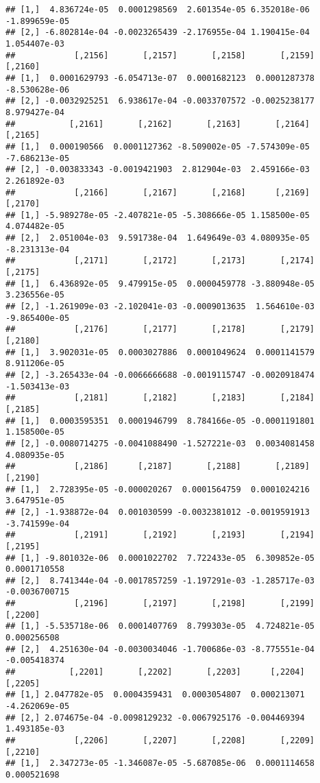 \documentclass[
]{article}
\begin{document}
\begin{verbatim}
## [1,]  4.836724e-05  0.0001298569  2.601354e-05 6.352018e-06 -1.899659e-05
## [2,] -6.802814e-04 -0.0023265439 -2.176955e-04 1.190415e-04  1.054407e-03
##            [,2156]       [,2157]       [,2158]       [,2159]       [,2160]
## [1,]  0.0001629793 -6.054713e-07  0.0001682123  0.0001287378 -8.530628e-06
## [2,] -0.0032925251  6.938617e-04 -0.0033707572 -0.0025238177  8.979427e-04
##           [,2161]       [,2162]       [,2163]       [,2164]       [,2165]
## [1,]  0.000190566  0.0001127362 -8.509002e-05 -7.574309e-05 -7.686213e-05
## [2,] -0.003833343 -0.0019421903  2.812904e-03  2.459166e-03  2.261892e-03
##            [,2166]       [,2167]       [,2168]      [,2169]       [,2170]
## [1,] -5.989278e-05 -2.407821e-05 -5.308666e-05 1.158500e-05  4.074482e-05
## [2,]  2.051004e-03  9.591738e-04  1.649649e-03 4.080935e-05 -8.231313e-04
##            [,2171]       [,2172]       [,2173]       [,2174]       [,2175]
## [1,]  6.436892e-05  9.479915e-05  0.0000459778 -3.880948e-05  3.236556e-05
## [2,] -1.261909e-03 -2.102041e-03 -0.0009013635  1.564610e-03 -9.865400e-05
##            [,2176]       [,2177]       [,2178]       [,2179]       [,2180]
## [1,]  3.902031e-05  0.0003027886  0.0001049624  0.0001141579  8.911206e-05
## [2,] -3.265433e-04 -0.0066666688 -0.0019115747 -0.0020918474 -1.503413e-03
##            [,2181]       [,2182]       [,2183]       [,2184]      [,2185]
## [1,]  0.0003595351  0.0001946799  8.784166e-05 -0.0001191801 1.158500e-05
## [2,] -0.0080714275 -0.0041088490 -1.527221e-03  0.0034081458 4.080935e-05
##            [,2186]      [,2187]       [,2188]       [,2189]       [,2190]
## [1,]  2.728395e-05 -0.000020267  0.0001564759  0.0001024216  3.647951e-05
## [2,] -1.938872e-04  0.001030599 -0.0032381012 -0.0019591913 -3.741599e-04
##            [,2191]       [,2192]       [,2193]       [,2194]       [,2195]
## [1,] -9.801032e-06  0.0001022702  7.722433e-05  6.309852e-05  0.0001710558
## [2,]  8.741344e-04 -0.0017857259 -1.197291e-03 -1.285717e-03 -0.0036700715
##            [,2196]       [,2197]       [,2198]       [,2199]      [,2200]
## [1,] -5.535718e-06  0.0001407769  8.799303e-05  4.724821e-05  0.000256508
## [2,]  4.251630e-04 -0.0030034046 -1.700686e-03 -8.775551e-04 -0.005418374
##           [,2201]       [,2202]       [,2203]      [,2204]       [,2205]
## [1,] 2.047782e-05  0.0004359431  0.0003054807  0.000213071 -4.262069e-05
## [2,] 2.074675e-04 -0.0098129232 -0.0067925176 -0.004469394  1.493185e-03
##            [,2206]       [,2207]       [,2208]       [,2209]      [,2210]
## [1,]  2.347273e-05 -1.346087e-05 -5.687085e-06  0.0001114658  0.000521698

\end{verbatim}
\end{document}
